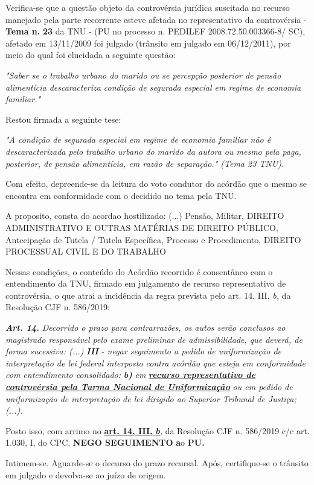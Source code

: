 \documentclass[12pt]{article}
\begin{document}
\justifying
\noindent Verifica-se que a questão objeto da controvérsia jurídica suscitada no recurso manejado pela parte recorrente esteve afetada no representativo da controvérsia - \textbf{Tema n. }\textbf{23} da TNU - (PU no processo n. PEDILEF 2008.72.50.003366-8/ SC),  afetado em 13/11/2009 foi julgado (trânsito em julgado em 06/12/2011), por meio do qual foi elucidada a seguinte questão:

\noindent \textit{"Saber se o trabalho urbano do marido ou se percepção posterior de pensão alimentícia descaracteriza condição de segurada especial em regime de economia familiar."}

\noindent Restou firmada a seguinte tese:

\noindent \textit{"A condição de segurada especial em regime de economia familiar não é descaracterizada pelo trabalho urbano do marido da autora ou mesmo pela paga, posterior, de pensão alimentícia, em razão de separação." (Tema 23 TNU).}

\noindent Com efeito, depreende-se da leitura do voto condutor do acórdão que o mesmo se encontra em conformidade com o decidido no  tema pela TNU.

\noindent A proposito, consta do acordao hostilizado: (...) Pensão, Militar, DIREITO ADMINISTRATIVO E OUTRAS MATÉRIAS DE DIREITO PÚBLICO, Antecipação de Tutela / Tutela Específica, Processo e Procedimento, DIREITO PROCESSUAL CIVIL E DO TRABALHO

\noindent Nessas condições, o conteúdo do Acórdão recorrido é consentâneo com o entendimento da TNU, firmado em julgamento de recurso representativo de controvérsia, o que atrai a incidência da regra prevista pelo art. 14, III, \textit{b,} da Resolução CJF n. 586/2019:

\noindent \textit{\textbf{Art. 14.}}\textit{ Decorrido o prazo para contrarrazões, os autos serão conclusos ao magistrado responsável pelo exame preliminar de admissibilidade, que deverá, de forma sucessiva: (...) }\textit{\textbf{III }}\textit{- negar seguimento a pedido de uniformização de interpretação de lei federal interposto contra acórdão que esteja em conformidade com entendimento consolidado: }\textit{\textbf{b)}}\textit{ em }\uline{\textit{\textbf{recurso representativo de controvérsia pela Turma Nacional de Uniformização}}}\textit{ ou em pedido de uniformização de interpretação de lei dirigido ao Superior Tribunal de Justiça;(...).}

\noindent Posto isso, com arrimo no \uline{\textbf{art. 14, III, }}\uline{\textit{\textbf{b}}}\textit{,} da Resolução CJF n. 586/2019 c/c art. 1.030, I, do CPC, \textbf{NEGO SEGUIMENTO }\textbf{a}o\textbf{ PU}\textbf{.}

\noindent Intimem-se. Aguarde-se o decurso do prazo recursal. Após, certifique-se o trânsito em julgado e devolva-se ao juízo de origem.
\end{document}
